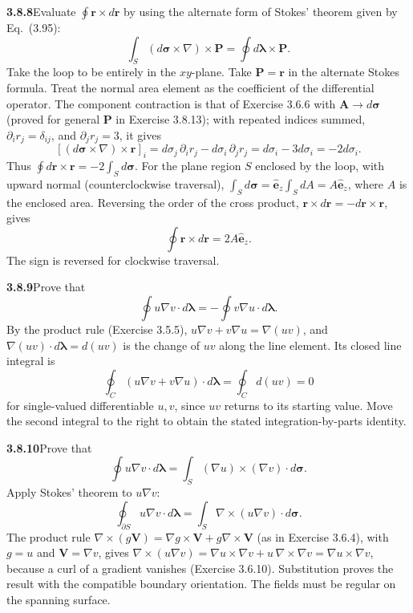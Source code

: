 \par\bigskip
\noindent\textbf{3.8.8}\quad Evaluate $\oint\mathbf{r}\times d\mathbf{r}$ by
using the alternate form of Stokes' theorem given by Eq.~(3.95):
\[
\int_{S}(d\boldsymbol{\sigma}\times\nabla)\times\mathbf{P}
=\oint d\boldsymbol{\lambda}\times\mathbf{P}.
\]
Take the loop to be entirely in the $xy$-plane.
\solution
Take $\mathbf P=\mathbf r$ in the alternate Stokes formula.
Treat the normal area element as the coefficient of the differential
operator. The component contraction is that of Exercise 3.6.6 with
$\mathbf A\to d\boldsymbol\sigma$ (proved for general $\mathbf P$ in
Exercise 3.8.13); with repeated indices summed,
$\partial_ir_j=\delta_{ij}$, and $\partial_jr_j=3$, it gives
\[
[(d\boldsymbol\sigma\times\nabla)\times\mathbf r]_i
=d\sigma_j\,\partial_i r_j-d\sigma_i\,\partial_j r_j
=d\sigma_i-3d\sigma_i=-2d\sigma_i.
\]
Thus $\oint d\mathbf r\times\mathbf r=-2\int_Sd\boldsymbol\sigma$.
For the plane region $S$ enclosed by the loop, with upward normal
(counterclockwise traversal), $\int_Sd\boldsymbol\sigma
=\hat{\mathbf e}_z\int_SdA=A\hat{\mathbf e}_z$, where $A$ is the enclosed
area. Reversing the order of the cross product,
$\mathbf r\times d\mathbf r=-d\mathbf r\times\mathbf r$, gives
\[
\boxed{\oint\mathbf r\times d\mathbf r=2A\hat{\mathbf e}_z}.
\]
The sign is reversed for clockwise traversal.

\par\bigskip
\noindent\textbf{3.8.9}\quad Prove that
\[
\oint u\nabla v\cdot d\boldsymbol{\lambda}
=-\oint v\nabla u\cdot d\boldsymbol{\lambda}.
\]
\solution
By the product rule (Exercise 3.5.5),
$u\nabla v+v\nabla u=\nabla(uv)$, and
$\nabla(uv)\cdot d\boldsymbol\lambda=d(uv)$ is the change of $uv$ along
the line element.
Its closed line integral is
\[
\oint_C(u\nabla v+v\nabla u)\cdot d\boldsymbol\lambda
=\oint_Cd(uv)=0
\]
for single-valued differentiable $u,v$, since $uv$ returns to its
starting value. Move the second integral to
the right to obtain the stated integration-by-parts identity.

\par\bigskip
\noindent\textbf{3.8.10}\quad Prove that
\[
\oint u\nabla v\cdot d\boldsymbol{\lambda}
=\int_{S}(\nabla u)\times(\nabla v)\cdot d\boldsymbol{\sigma}.
\]
\solution
Apply Stokes' theorem to $u\nabla v$:
\[
\oint_{\partial S}u\nabla v\cdot d\boldsymbol\lambda
=\int_S\nabla\times(u\nabla v)\cdot d\boldsymbol\sigma.
\]
The product rule
$\nabla\times(g\mathbf V)=\nabla g\times\mathbf V+g\nabla\times\mathbf V$
(as in Exercise 3.6.4), with $g=u$ and $\mathbf V=\nabla v$, gives
$\nabla\times(u\nabla v)=\nabla u\times\nabla v+
u\,\nabla\times\nabla v=\nabla u\times\nabla v$, because a curl of a
gradient vanishes (Exercise 3.6.10).
Substitution proves the result with the compatible boundary orientation.
The fields must be regular on the spanning surface.

